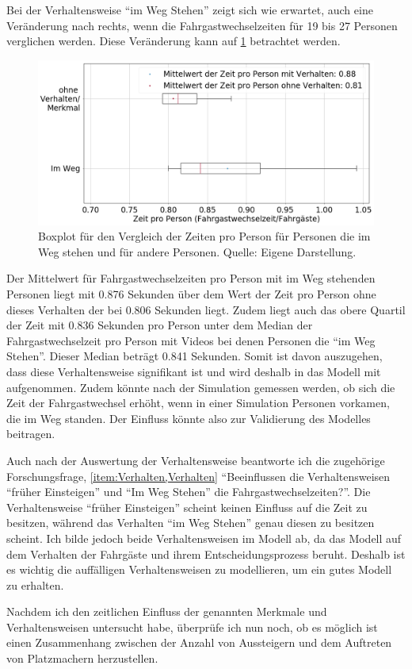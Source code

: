 Bei der Verhaltensweise "`im Weg Stehen"' zeigt sich wie erwartet, auch eine Ver\-än\-de\-rung nach rechts, wenn die Fahrgastwechselzeiten für 19 bis 27 Personen verglichen werden. Diese Veränderung kann auf \figurename \ref{fig:BoxPlotImWeg} betrachtet werden.
\begin{figure}[H]
	\centering
		\includegraphics[height=0.3\textwidth]{pictures/data_evaluation/behavior/comp_ImWeg.png}
	\caption{Boxplot für den Vergleich der Zeiten pro Person für Personen die im Weg stehen und für andere Personen. Quelle: Eigene Darstellung.}
	\label{fig:BoxPlotImWeg}
\end{figure}
Der Mittelwert für Fahrgastwechselzeiten pro Person mit im Weg stehenden Personen liegt mit 0.876 Sekunden über dem Wert der Zeit pro Person ohne dieses Verhalten der bei 0.806 Sekunden liegt. Zudem liegt auch das obere Quartil der Zeit mit 0.836 Sekunden pro Person unter dem Median der Fahrgastwechselzeit pro Person mit Videos bei denen Personen die "`im Weg Stehen"'. Dieser Median beträgt 0.841 Sekunden. Somit ist davon auszugehen, dass diese Verhaltensweise signifikant ist und wird deshalb in das Modell mit aufgenommen. Zudem könnte nach der Simulation gemessen werden, ob sich die Zeit der Fahrgastwechsel erhöht, wenn in einer Simulation Personen vorkamen, die im Weg standen. Der Einfluss könnte also zur Validierung des Modelles beitragen.

Auch nach der Auswertung der Verhaltensweise beantworte ich die zugehörige Forschungsfrage, \ref{item:Verhalten,Verhalten} "`Beeinflussen die Verhaltensweisen "`früher Einsteigen"' und "`Im Weg Stehen"' die Fahrgastwechselzeiten?"'. Die Verhaltensweise "`früher Einsteigen"' scheint keinen Einfluss auf die Zeit zu besitzen, während das Verhalten "`im Weg Stehen"' genau diesen zu besitzen scheint. Ich bilde jedoch beide Verhaltensweisen im Modell ab, da das Modell auf dem Verhalten der Fahrgäste und ihrem Entscheidungsprozess beruht. Deshalb ist es wichtig die auffälligen Verhaltensweisen zu modellieren, um ein gutes Modell zu erhalten.

Nachdem ich den zeitlichen Einfluss der genannten Merkmale und Verhaltensweisen untersucht habe, überprüfe ich nun noch, ob es möglich ist einen Zusammenhang zwischen der Anzahl von Aussteigern und dem Auftreten von Platzmachern herzustellen.

